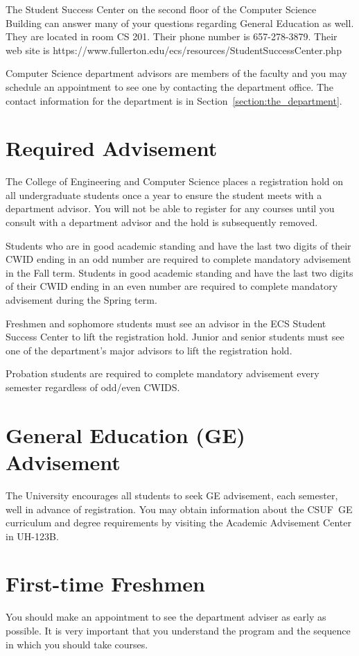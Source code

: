 \documentclass{book}
\newcommand{\CampusName}{CSUF}
\begin{document}
The Student Success Center on the second floor of the Computer Science
Building can answer many of your questions regarding General Education
as well. They are located in room CS 201. Their phone number is
657-278-3879. Their web site is
https://www.fullerton.edu/ecs/resources/StudentSuccessCenter.php

Computer Science department advisors are members of the faculty and
you may schedule an appointment to see one by contacting the
department office. The contact information for the department is in
Section~\ref{section:the_department}.

\section{Required Advisement}
 The College of Engineering and Computer
Science places a registration hold on all undergraduate students once
a year to ensure the student meets with a department advisor. You will
not be able to register for any courses until you consult with a
department advisor and the hold is subsequently removed.

Students who are in good academic standing and have the last two
digits of their CWID ending in an odd number are required to complete
mandatory advisement in the Fall term. Students in good academic
standing and have the last two digits of their CWID ending in an even
number are required to complete mandatory advisement during the Spring
term.

Freshmen and sophomore students must see an advisor in the ECS Student
Success Center to lift the registration hold. Junior and senior
students must see one of the department's major advisors to lift the
registration hold.

Probation students are required to complete mandatory advisement every
semester regardless of odd/even CWIDS.

\section{General Education (GE) Advisement}
 
The University encourages all students to seek GE advisement, each
semester, well in advance of registration.  You may obtain information
about the \CampusName~GE curriculum and degree requirements by
visiting the Academic Advisement Center in UH-123B.

\section{First-time Freshmen}
You should make an appointment to see the department adviser as early
as possible. It is very important that you understand the program and
the sequence in which you should take courses.
\end{document}
